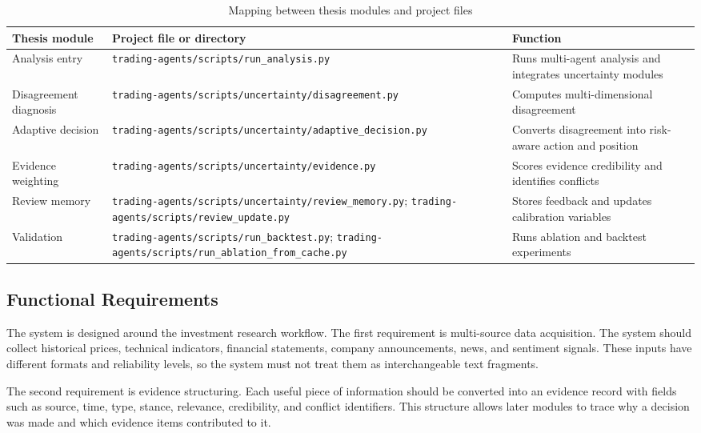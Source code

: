 \documentclass[14pt,a4paper]{extarticle}
\begin{document}
\begin{table}[H]
\caption{Mapping between thesis modules and project files}
\label{tab:files}
\centering
\begin{tabular}{|p{}|p{}|p{}|}
\hline
Thesis module & Project file or directory & Function \\
\hline
Analysis entry & \texttt{trading-agents/scripts/run\_analysis.py} & Runs multi-agent analysis and integrates uncertainty modules \\
\hline
Disagreement diagnosis & \texttt{trading-agents/scripts/uncertainty/disagreement.py} & Computes multi-dimensional disagreement \\
\hline
Adaptive decision & \texttt{trading-agents/scripts/uncertainty/adaptive\_decision.py} & Converts disagreement into risk-aware action and position \\
\hline
Evidence weighting & \texttt{trading-agents/scripts/uncertainty/evidence.py} & Scores evidence credibility and identifies conflicts \\
\hline
Review memory & \texttt{trading-agents/scripts/uncertainty/review\_memory.py}; \texttt{trading-agents/scripts/review\_update.py} & Stores feedback and updates calibration variables \\
\hline
Validation & \texttt{trading-agents/scripts/run\_backtest.py}; \texttt{trading-agents/scripts/run\_ablation\_from\_cache.py} & Runs ablation and backtest experiments \\
\hline
\end{tabular}
\end{table}

\subsection{Functional Requirements}

The system is designed around the investment research workflow. The first requirement is multi-source data acquisition. The system should collect historical prices, technical indicators, financial statements, company announcements, news, and sentiment signals. These inputs have different formats and reliability levels, so the system must not treat them as interchangeable text fragments.

The second requirement is evidence structuring. Each useful piece of information should be converted into an evidence record with fields such as source, time, type, stance, relevance, credibility, and conflict identifiers. This structure allows later modules to trace why a decision was made and which evidence items contributed to it.
\end{document}
